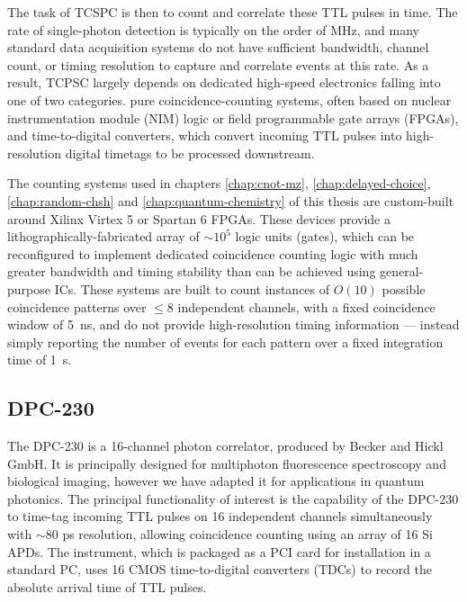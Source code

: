The task of TCSPC is then to count and correlate these TTL pulses in time.  The rate of single-photon detection is typically on the order of MHz, and many standard data acquisition systems do not have sufficient bandwidth, channel count, or timing resolution to capture and correlate events at this rate. As a result, TCPSC largely depends on dedicated high-speed electronics falling into one of two categories. pure coincidence-counting systems, often based on nuclear instrumentation module (NIM) logic or field programmable gate arrays (FPGAs), and time-to-digital converters, which convert incoming TTL pulses into high-resolution digital timetags to be processed downstream.

The counting systems used in chapters \ref{chap:cnot-mz}, \ref{chap:delayed-choice}, \ref{chap:random-chsh} and \ref{chap:quantum-chemistry} of this thesis are custom-built around Xilinx Virtex 5 or Spartan 6 FPGAs. These devices provide a lithographically-fabricated array of $\sim 10^5$ logic units (gates), which can be reconfigured to implement dedicated coincidence counting logic with much greater bandwidth and timing stability than can be achieved using general-purpose ICs. These systems are built to count instances of $O(10)$ possible coincidence patterns over $\le8$ independent channels, with a fixed coincidence window of \SI{5}{\nano\second}, and do not provide high-resolution timing information --- instead simply reporting the number of events for each pattern over a fixed integration time of \SI{1}{\second}.

\subsection{DPC-230} 
The DPC-230 is a 16-channel photon correlator, produced by Becker and Hickl GmbH. It is principally designed for multiphoton fluorescence spectroscopy and biological imaging, however we have adapted it for applications in quantum photonics. The principal functionality of interest is the capability of the DPC-230 to time-tag incoming TTL pulses on 16 independent channels simultaneously with $\sim 80$ ps resolution, allowing coincidence counting using an array of 16 Si APDs. The instrument, which is packaged as a PCI card for installation in a standard PC, uses 16 CMOS time-to-digital converters (TDCs) to record the absolute arrival time of TTL pulses.  

